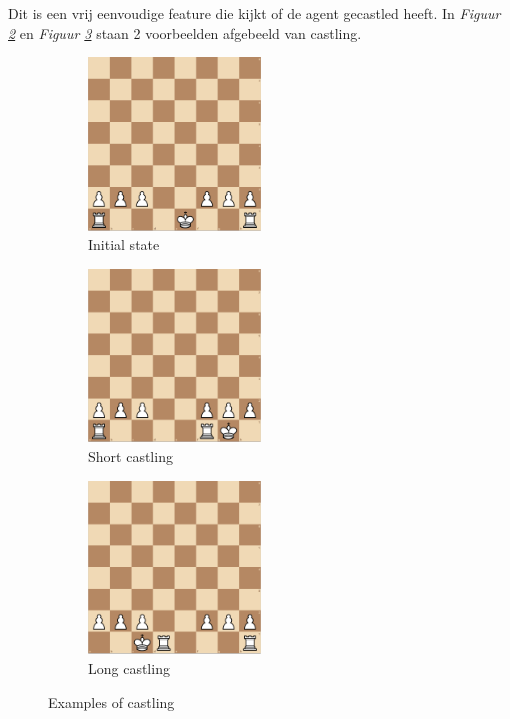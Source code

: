 \documentclass[a4paper,openany]{uantwerpenassignment}
\newcommand{\figref}[1]{\textit{Figuur \ref{#1}}}
\begin{document}
Dit is een vrij eenvoudige feature die kijkt of de agent gecastled heeft. In \figref{fig:castling2} en \figref{fig:castling3} staan 2 voorbeelden afgebeeld van castling.

\begin{figure}[h]
    \centering
    \begin{subfigure}{.3\textwidth}
        \includegraphics[width=130pt]{images/castling1.png}
        \caption{Initial state}
        \label{fig:castling1}
    \end{subfigure}
    \begin{subfigure}{.3\textwidth}
        \includegraphics[width=130pt]{images/castling2.png}
        \caption{Short castling}
        \label{fig:castling2}
    \end{subfigure}
    \begin{subfigure}{.3\textwidth}
        \includegraphics[width=130pt]{images/castling3.png}
        \caption{Long castling}
        \label{fig:castling3}
    \end{subfigure}
    \caption{Examples of castling}
    \label{fig:castling}
\end{figure}
\end{document}
